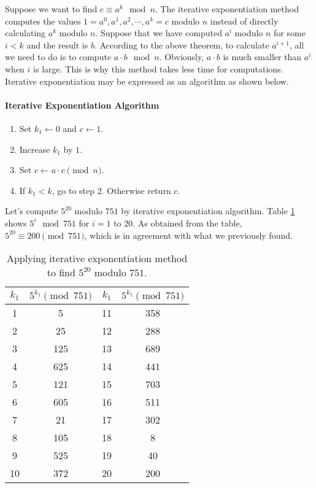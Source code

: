 \documentclass{subfile}
\begin{document}
	Suppose we want to find $c \equiv a^k \mod n$. The iterative exponentiation method computes the values $1=a^0, a^1, a^2, \cdots, a^k=c$ modulo $n$ instead of directly calculating $a^k$ modulo $n$. Suppose that we have computed $a^i$ modulo $n$ for some $i<k$ and the result is $b$. According to the above theorem, to calculate $a^{i+1}$, all we need to do is to compute $a\cdot b \mod n$. Obviously, $a \cdot b$ is much smaller than $a^i$ when $i$ is large. This is why this method takes less time for computations. Iterative exponentiation may be expressed as an algorithm as shown below.

	\paragraph{Iterative Exponentiation Algorithm}
	\begin{enumerate}[1.]
		\item Set $k_1 \longleftarrow 0$ and $c \longleftarrow 1$.
		\item Increase $k_1$ by $1$.
		\item Set $c \longleftarrow a \cdot c \pmod n$.
		\item If $k_1<k$, go to step $2$. Otherwise return $c$.
	\end{enumerate}

	\begin{example}
		Let's compute $5^{20}$ modulo $751$ by iterative exponentiation algorithm. Table \ref{table:modmult} shows $5^i \mod{751}$ for $i=1$ to $20$. As obtained from the table, $5^{20} \equiv 200 \pmod{751}$, which is in agreement with what we previously found.
		\begin{table}
			\centering
			\begin{tabular}{|c|c|c|c|}
				\hline
				$k_1$ & $5^{k_1} \pmod{751}$ & $k_1$ & $5^{k_1} \pmod{751}$ \\
				\hline
				1 & 5 & 11 & 358  \\
				\hline
				2 & 25 & 12 & 288 \\
				\hline
				3 & 125 & 13 & 689 \\
				\hline
				4 & 625 & 14 & 441  \\
				\hline
				5 & 121 & 15 & 703 \\
				\hline
				6 & 605 & 16 & 511 \\
				\hline
				7 & 21 & 17 & 302 \\
				\hline
				8 & 105 & 18 & 8 \\
				\hline
				9 & 525 & 19 & 40 \\
				\hline
				10 & 372 & 20 & 200 \\
				\hline
			\end{tabular}
			\caption{Applying iterative exponentiation method to find $5^{20}$ modulo $751$.}
			\label{table:modmult}
		\end{table}
	\end{example}
\end{document}

